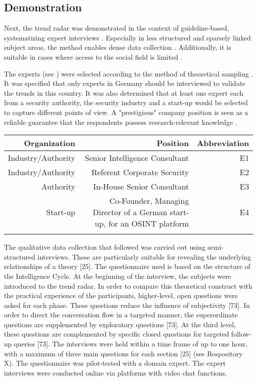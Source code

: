\documentclass[10pt]{article}
\begin{document}
\subsection{Demonstration}

Next, the trend radar was demonstrated in the context of guideline-based,
systematizing expert interviews \cite{Bogner.2014, Glaser.2009, Meuser.1991}.
Especially in less structured and sparsely linked subject areas, the method
enables dense data collection \cite{Bogner.2014,Meuser.1991}. Additionally,
it is suitable in cases where access to the social field is limited \cite{Bogner.2002c, Glaser.2009}.

The experts (see ) were selected according to the method of
theoretical sampling \cite{Glaser.1967,Eisenhardt.1989}. It was specified that only experts in
Germany should be interviewed to validate the trends in this
country. It was also determined that at least one expert each
from a security authority, the security industry and a
start-up would be selected to capture different points of
view. A "prestigious" company position is seen as a reliable
guarantee that the respondents possess research-relevant knowledge \cite{Bogner.2002b}.

\begin{tabular}[h]{r|r|r}
    \caption{interviewed experts}
    Organization & Position & Abbreviation \\
    \hline
    Industry/Authority & Senior Intelligence Consultant & E1 \\
    \hline
    Industry/Authority & Referent Corporate Security & E2 \\
    \hline
    Authority & In-House Senior Consultant & E3 \\
    \hline
    Start-up  & Co-Founder, Managing Director of a German start-up, for an OSINT platform & E4 \\
    \label{tab: experts}
\end{tabular}

The qualitative data collection that followed was carried out using
semi-structured interviews. These are particularly suitable for
revealing the underlying relationships of a theory [25]. The
questionnaire used is based on the structure of the Intelligence Cycle.
At the beginning of the interview, the subjects were introduced to the
trend radar. In order to compare this theoretical construct with the
practical experience of the participants, higher-level, open questions
were asked for each phase. These questions reduce the influence of
subjectivity [73]. In order to direct the conversation flow in a
targeted manner, the superordinate questions are supplemented by
exploratory questions [73]. At the third level, these questions are
complemented by specific closed questions for targeted follow-up
queries [73]. The interviews were held within a time frame of up to
one hour, with a maximum of three main questions for each section
 [25] (see Respository X). The questionnaire was pilot-tested with a
domain expert. The expert interviews were conducted online via
platforms with video chat functions.
\end{document}
